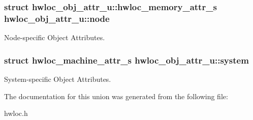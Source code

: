\hypertarget{unionhwloc__obj__attr__u_941994ad83275213249f8adfd8204465}{
\subsubsection[{node}]{\setlength{\rightskip}{0pt plus 5cm}struct {\bf hwloc\_\-obj\_\-attr\_\-u::hwloc\_\-memory\_\-attr\_\-s}  {\bf hwloc\_\-obj\_\-attr\_\-u::node}}}
\label{unionhwloc__obj__attr__u_941994ad83275213249f8adfd8204465}


Node-specific Object Attributes. 

\hypertarget{unionhwloc__obj__attr__u_a65b98d3eada000628dc66668e4954df}{
\subsubsection[{system}]{\setlength{\rightskip}{0pt plus 5cm}struct {\bf hwloc\_\-machine\_\-attr\_\-s} {\bf hwloc\_\-obj\_\-attr\_\-u::system}}}
\label{unionhwloc__obj__attr__u_a65b98d3eada000628dc66668e4954df}


System-specific Object Attributes. 



The documentation for this union was generated from the following file:\begin{CompactItemize}
\item 
hwloc.h\end{CompactItemize}
